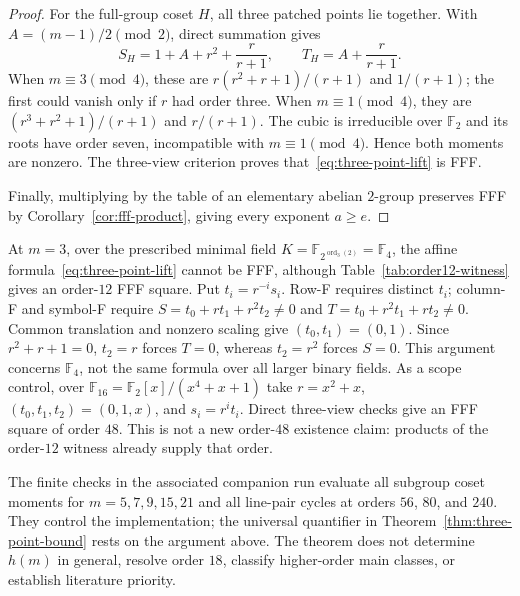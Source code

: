 \begin{proof}
For the full-group coset $H$, all three patched points lie together.  With
$A=(m-1)/2\pmod2$, direct summation gives
\[
 S_H=1+A+r^2+\frac r{r+1},\qquad
 T_H=A+\frac r{r+1}.
\]
When $m\equiv3\pmod4$, these are
$r(r^2+r+1)/(r+1)$ and $1/(r+1)$; the first could vanish only if $r$
had order three.  When $m\equiv1\pmod4$, they are
$(r^3+r^2+1)/(r+1)$ and $r/(r+1)$.  The cubic is irreducible over
$\mathbb F_2$ and its roots have order seven, incompatible with
$m\equiv1\pmod4$.  Hence both moments are nonzero.  The three-view
criterion proves that~\eqref{eq:three-point-lift} is FFF.

Finally, multiplying by the table of an elementary abelian $2$-group
preserves FFF by Corollary~\ref{cor:fff-product}, giving every exponent
$a\geq e$.
\end{proof}

\begin{remark}
At $m=3$, over the prescribed minimal field
$K=\mathbb F_{2^{\operatorname{ord}_3(2)}}=\mathbb F_4$,
the affine formula~\eqref{eq:three-point-lift} cannot be FFF,
although Table~\ref{tab:order12-witness} gives an order-$12$ FFF square.
Put $t_i=r^{-i}s_i$. Row-F requires distinct $t_i$; column-F and symbol-F
require $S=t_0+rt_1+r^2t_2\ne0$ and $T=t_0+r^2t_1+rt_2\ne0$.
Common translation and nonzero scaling give $(t_0,t_1)=(0,1)$.
Since $r^2+r+1=0$, $t_2=r$ forces $T=0$, whereas $t_2=r^2$
forces $S=0$.
This argument concerns $\mathbb F_4$, not the same formula over all larger
binary fields. As a scope control, over
$\mathbb F_{16}=\mathbb F_2[x]/(x^4+x+1)$ take $r=x^2+x$,
$(t_0,t_1,t_2)=(0,1,x)$, and $s_i=r^it_i$.
Direct three-view checks give an FFF square of order $48$.
This is not a new order-$48$ existence claim: products of the
order-$12$ witness already supply that order.
\end{remark}

The finite checks in the associated companion run evaluate all subgroup
coset moments for $m=5,7,9,15,21$ and all line-pair cycles at orders
$56$, $80$, and $240$.  They control the implementation; the universal
quantifier in Theorem~\ref{thm:three-point-bound} rests on the argument
above.  The theorem does not determine $h(m)$ in general, resolve order
$18$, classify higher-order main classes, or establish literature priority.
